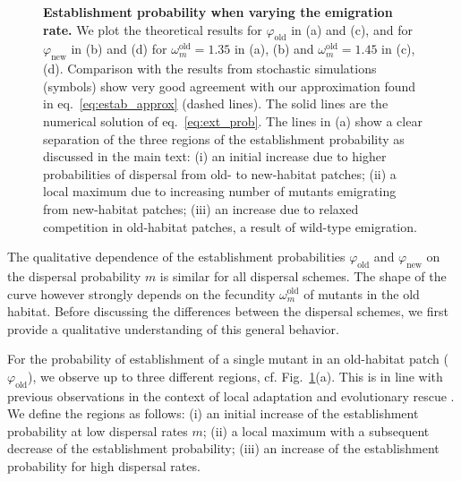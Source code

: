 \documentclass[a4paper,11pt]{article}
\begin{document}
\begin{figure}[t!]
	\caption{\textbf{Establishment probability when varying the emigration rate.} \small We plot the theoretical results for $\varphi_{\text{old}}$ in (a) and (c), and for $\varphi_{\text{new}}$ in (b) and (d) for $\omega^\text{old}_m=1.35$ in (a), (b) and $\omega^\text{old}_m=1.45$ in (c), (d). Comparison with the results from stochastic simulations (symbols) show very good agreement with our approximation found in eq.~\eqref{eq:estab_approx} (dashed lines). The solid lines are the numerical solution of eq.~\eqref{eq:ext_prob}. The lines in (a) show a clear separation of the three regions of the establishment probability as discussed in the main text: {\color{change}(i) an initial increase due to higher probabilities of dispersal from old- to new-habitat patches; (ii) a local maximum due to increasing number of mutants emigrating from new-habitat patches; (iii) an increase due to relaxed competition in old-habitat patches, a result of wild-type emigration.}}
	\label{fig:vary_m_est}
\end{figure}

The qualitative dependence of the establishment probabilities $\varphi_{\text{old}}$ and $\varphi_{\text{new}}$ on the dispersal probability $m$ is similar for all dispersal schemes. The shape of the curve however strongly depends on the fecundity $\omega^\text{old}_m$ of mutants in the old habitat. Before discussing the differences between the dispersal schemes, we first provide a qualitative understanding of this general behavior.

For the probability of establishment of a single mutant in an old-habitat patch ($\varphi_{\text{old}}$), we observe up to three different regions, cf. Fig.~\ref{fig:vary_m_est}(a). This is in line with previous observations in the context of local adaptation \citep[e.g.][]{kawecki_1995,tomasini_2018} and evolutionary rescue \citep{uecker_2014}. We define the regions as follows: (i) an initial increase of the establishment probability at low dispersal rates $m$; (ii) a local maximum with a subsequent decrease of the establishment probability; (iii) an increase of the establishment probability for high dispersal rates.
\end{document}

